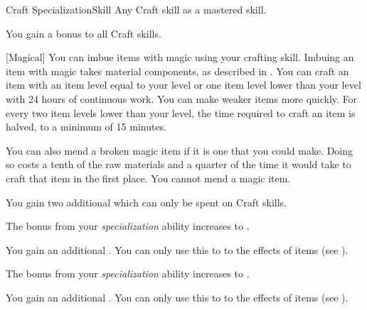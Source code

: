     \begin{feat}{Craft Specialization}{Skill}
        \featpre Any Craft skill as a mastered skill.

         You gain a  bonus to all Craft skills.

        [Magical] You can imbue items with magic using your crafting skill.
        Imbuing an item with magic takes material components, as described in .
        You can craft an item with an item level equal to your level or one item level lower than your level with 24 hours of continuous work.
        You can make weaker items more quickly.
        For every two item levels lower than your level, the time required to craft an item is halved, to a minimum of 15 minutes.

        You can also mend a broken magic item if it is one that you could make.
        Doing so costs a tenth of the raw materials and a quarter of the time it would take to craft that item in the first place.
        You cannot mend a  magic item.

         You gain two additional  which can only be spent on Craft skills.

         The bonus from your \textit{specialization} ability increases to .

         You gain an additional .
        You can only use this  to  to the effects of items (see ).

         The bonus from your \textit{specialization} ability increases to .

         You gain an additional .
        You can only use this  to  to the effects of items (see ).
    \end{feat}

